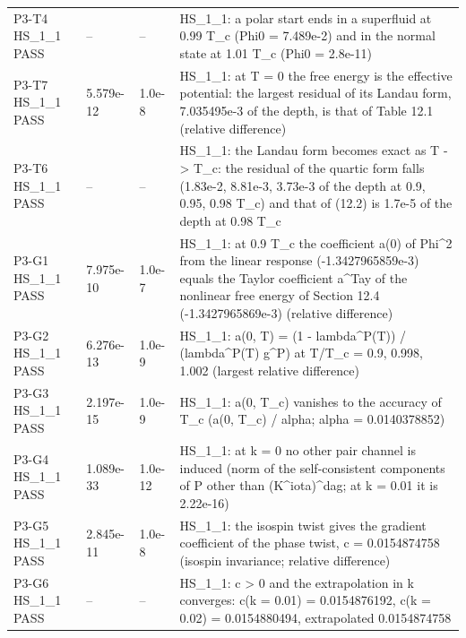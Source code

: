 \documentclass[aps,prd,onecolumn,superscriptaddress,nofootinbib,floatfix,longbibliography]{revtex4-2}
\begin{document}
\begin{longtable}{p{}p{}p{}p{}}
P3-T4 HS\_1\_1 \newline PASS & -- & -- & HS\_1\_1: a polar start ends in a superfluid at 0.99 T\_c (Phi0 = 7.489e-2) and in the normal state at 1.01 T\_c (Phi0 = 2.8e-11) \\
P3-T7 HS\_1\_1 \newline PASS & 5.579e-12 & 1.0e-8 & HS\_1\_1: at T = 0 the free energy is the effective potential: the largest residual of its Landau form, 7.035495e-3 of the depth, is that of Table 12.1 (relative difference) \\
P3-T6 HS\_1\_1 \newline PASS & -- & -- & HS\_1\_1: the Landau form becomes exact as T -\textgreater{} T\_c: the residual of the quartic form falls (1.83e-2, 8.81e-3, 3.73e-3 of the depth at 0.9, 0.95, 0.98 T\_c) and that of (12.2) is 1.7e-5 of the depth at 0.98 T\_c \\
P3-G1 HS\_1\_1 \newline PASS & 7.975e-10 & 1.0e-7 & HS\_1\_1: at 0.9 T\_c the coefficient a(0) of \textbar{}Phi\textbar{}\textasciicircum{}2 from the linear response (-1.3427965859e-3) equals the Taylor coefficient a\textasciicircum{}Tay of the nonlinear free energy of Section 12.4 (-1.3427965869e-3) (relative difference) \\
P3-G2 HS\_1\_1 \newline PASS & 6.276e-13 & 1.0e-9 & HS\_1\_1: a(0, T) = (1 - lambda\textasciicircum{}P(T)) / (lambda\textasciicircum{}P(T) g\textasciicircum{}P) at T/T\_c = 0.9, 0.998, 1.002 (largest relative difference) \\
P3-G3 HS\_1\_1 \newline PASS & 2.197e-15 & 1.0e-9 & HS\_1\_1: a(0, T\_c) vanishes to the accuracy of T\_c (\textbar{}a(0, T\_c)\textbar{} / alpha; alpha = 0.0140378852) \\
P3-G4 HS\_1\_1 \newline PASS & 1.089e-33 & 1.0e-12 & HS\_1\_1: at k = 0 no other pair channel is induced (norm of the self-consistent components of P other than (K\textasciicircum{}iota)\textasciicircum{}dag; at k = 0.01 it is 2.22e-16) \\
P3-G5 HS\_1\_1 \newline PASS & 2.845e-11 & 1.0e-8 & HS\_1\_1: the isospin twist gives the gradient coefficient of the phase twist, c = 0.0154874758 (isospin invariance; relative difference) \\
P3-G6 HS\_1\_1 \newline PASS & -- & -- & HS\_1\_1: c \textgreater{} 0 and the extrapolation in k converges: c(k = 0.01) = 0.0154876192, c(k = 0.02) = 0.0154880494, extrapolated 0.0154874758 \\

\end{longtable}
\end{document}
